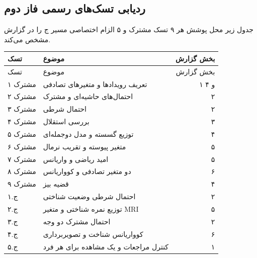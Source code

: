 \documentclass[a4paper,11pt]{article}
\begin{document}
\subsection*{ردیابی تسک‌های رسمی فاز دوم}
جدول زیر محل پوشش هر ۹ تسک مشترک و ۵ الزام اختصاصی مسیر ج را در گزارش مشخص می‌کند.
\small
\begin{longtable}{p{2.0cm} p{9.0cm} r}
\toprule
تسک & موضوع & بخش گزارش \\
\midrule
\endfirsthead
\toprule
تسک & موضوع & بخش گزارش \\
\midrule
\endhead

مشترک ۱ & تعریف رویدادها و متغیرهای تصادفی & ۱ و ۴ \\
مشترک ۲ & احتمال‌های حاشیه‌ای و مشترک & ۲ \\
مشترک ۳ & احتمال شرطی & ۲ \\
مشترک ۴ & بررسی استقلال & ۳ \\
مشترک ۵ & توزیع گسسته و مدل دوجمله‌ای & ۴ \\
مشترک ۶ & متغیر پیوسته و تقریب نرمال & ۵ \\
مشترک ۷ & امید ریاضی و واریانس & ۵ \\
مشترک ۸ & دو متغیر تصادفی و کوواریانس & ۶ \\
مشترک ۹ & قضیه بیز & ۴ \\
ج.۱ & احتمال شرطی وضعیت شناختی & ۲ \\
ج.۲ & توزیع نمره شناختی و متغیر MRI & ۵ \\
ج.۳ & احتمال مشترک دو وجه & ۲ \\
ج.۴ & کوواریانس شناخت و تصویربرداری & ۶ \\
ج.۵ & کنترل مراجعات و یک مشاهده برای هر فرد & ۱ \\

\bottomrule
\end{longtable}
\end{document}

